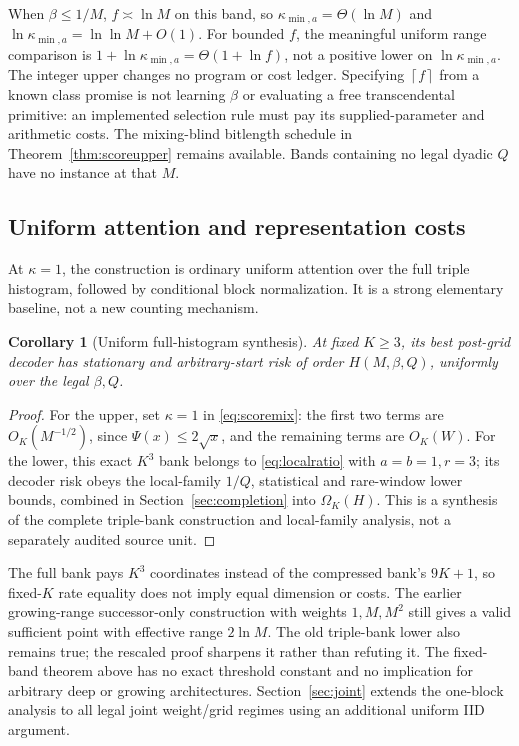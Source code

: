 \documentclass[11pt,letterpaper]{article}
\newtheorem{corollary}[theorem]{Corollary}
\theoremstyle{definition}\newtheorem{definition}[theorem]{Definition}
\theoremstyle{remark}\newtheorem{remark}[theorem]{Remark}
\newcommand{\ceil}[1]{\left\lceil #1\right\rceil}
\begin{document}
When $\beta\le1/M$, $f\asymp\ln M$ on this band, so $\kappa_{\min,a}=\Theta(\ln M)$ and $\ln\kappa_{\min,a}=\ln\ln M+O(1)$. For bounded $f$, the meaningful uniform range comparison is $1+\ln\kappa_{\min,a}=\Theta(1+\ln f)$, not a positive lower on $\ln\kappa_{\min,a}$. The integer upper changes no program or cost ledger. Specifying $\ceil f$ from a known class promise is not learning $\beta$ or evaluating a free transcendental primitive: an implemented selection rule must pay its supplied-parameter and arithmetic costs. The mixing-blind bitlength schedule in Theorem~\ref{thm:scoreupper} remains available. Bands containing no legal dyadic $Q$ have no instance at that $M$.

\subsection{Uniform attention and representation costs}
At $\kappa=1$, the construction is ordinary uniform attention over the full triple histogram, followed by conditional block normalization. It is a strong elementary baseline, not a new counting mechanism.
\begin{corollary}[Uniform full-histogram synthesis]\label{cor:hist}
At fixed $K\ge3$, its best post-grid decoder has stationary and arbitrary-start risk of order $H(M,\beta,Q)$, uniformly over the legal $\beta,Q$.
\end{corollary}
\begin{proof}
For the upper, set $\kappa=1$ in \eqref{eq:scoremix}: the first two terms are $O_K(M^{-1/2})$, since $\Psi(x)\le2\sqrt x$, and the remaining terms are $O_K(W)$. For the lower, this exact $K^3$ bank belongs to \eqref{eq:localratio} with $a=b=1,r=3$; its decoder risk obeys the local-family $1/Q$, statistical and rare-window lower bounds, combined in Section~\ref{sec:completion} into $\Omega_K(H)$. This is a synthesis of the complete triple-bank construction and local-family analysis, not a separately audited source unit.
\end{proof}

The full bank pays $K^3$ coordinates instead of the compressed bank's $9K+1$, so fixed-$K$ rate equality does not imply equal dimension or costs. The earlier growing-range successor-only construction with weights $1,M,M^2$ still gives a valid sufficient point with effective range $2\ln M$. The old triple-bank lower also remains true; the rescaled proof sharpens it rather than refuting it. The fixed-band theorem above has no exact threshold constant and no implication for arbitrary deep or growing architectures. Section~\ref{sec:joint} extends the one-block analysis to all legal joint weight/grid regimes using an additional uniform IID argument.
\end{document}
